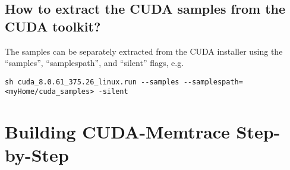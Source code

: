 \documentclass{scrartcl}
\begin{document}
\subsection{How to extract the CUDA samples from the CUDA toolkit?}
The samples can be separately extracted from the CUDA installer using the “samples”, “samplespath”, and “silent” flags, e.g.
\begin{lstlisting}[language=myLang]
sh cuda_8.0.61_375.26_linux.run --samples --samplespath=<myHome/cuda_samples> -silent
\end{lstlisting}

\newpage

\section{Building CUDA-Memtrace Step-by-Step}
\end{document}
